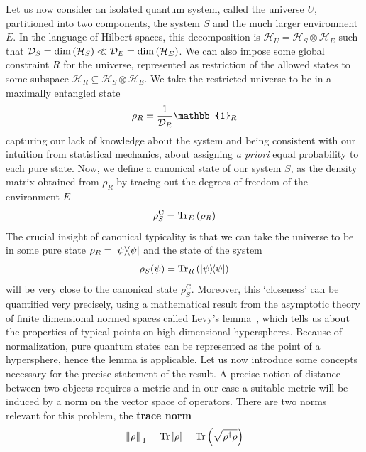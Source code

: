 Let us now consider an isolated quantum system, called the universe \(U\), partitioned
into two components, the system \(S\) and the much larger environment \(E\). In the language of Hilbert spaces, this decomposition is
\(\mathcal{H}_U = \mathcal{H}_S \otimes \mathcal{H}_E\) such that \(\mathcal{D}_S = \mathrm{dim}\left(\mathcal{H}_S\right)
\ll \mathcal{D}_E = \mathrm{dim}\left(\mathcal{H}_E\right)\). We can also impose some global constraint \(R\) for the universe, represented
as restriction of the allowed states to some subspace \(\mathcal{H}_R \subseteq  \mathcal{H}_S \otimes \mathcal{H}_E \).
We take the restricted universe to be in a maximally entangled state
\begin{equation}
	\rho_R = \frac{1}{\dimension_R} \mathbb{1}_R
\end{equation}
capturing our lack of knowledge about the system and being consistent with our intuition from statistical mechanics, about assigning
\textit{a priori} equal probability to each pure state. Now, we define a canonical state of our system \(S\), as the density
matrix obtained from \(\rho_R\) by tracing out the degrees of freedom of the environment \(E\)
\begin{equation}
	\rho_S^{\mathrm{C}} = \Tr_E\left(\rho_R\right)
\end{equation}
The crucial insight of canonical typicality is that we can take the universe to be in some pure state \(\rho_R = \ketbra{\psi}{\psi}\)
and the state of the system
\begin{equation}
	\rho_S(\psi) = \Tr_R \left(\ketbra{\psi}{\psi}\right)
\end{equation}
will be very close to the canonical state
\(\rho_S^{\mathrm{C}}\). Moreover, this `closeness' can be quantified very precisely, using a mathematical result from the
asymptotic theory of finite dimensional normed spaces called Levy's lemma~\autocite{VitaliD.Milman1986}, which
tells us about the properties of typical points on high-dimensional hyperspheres. Because of normalization, pure quantum states
can be represented as the point of a hypersphere, hence the lemma is applicable.
Let us now
introduce some concepts necessary for the precise statement of the result. A precise notion of distance between two objects requires a metric and in
our case a suitable metric will be induced by a norm on the vector space of operators. There are two norms relevant
for this problem, the \textbf{trace norm}
\begin{equation}
	\norm*{\rho}_1 = \Tr\abs{\rho} = \Tr\left(\sqrt{\rho^{\dagger}\rho}\right)
\end{equation}
